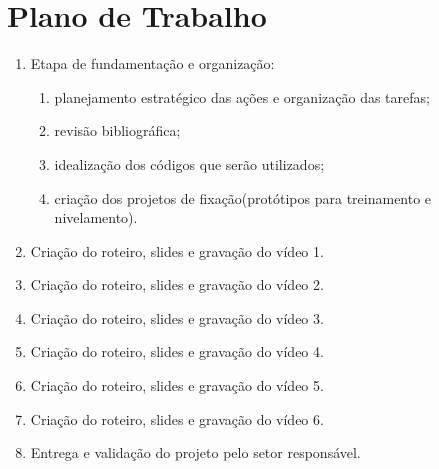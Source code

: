 \documentclass[a4paper,10pt]{article} %
\begin{document}


\section{Plano de Trabalho}

 \begin{enumerate}
  \item Etapa de fundamentação e organização:
      \begin{enumerate}
         \item planejamento estratégico das ações e organização das tarefas;
         \item revisão bibliográfica;
         \item idealização dos códigos que serão utilizados;
         \item criação dos projetos de fixação(protótipos para treinamento e nivelamento).    
      \end{enumerate}    
  \item Criação do roteiro, slides e gravação do vídeo 1.
  \item Criação do roteiro, slides e gravação do vídeo 2.
  \item Criação do roteiro, slides e gravação do vídeo 3.
  \item Criação do roteiro, slides e gravação do vídeo 4.
  \item Criação do roteiro, slides e gravação do vídeo 5.
  \item Criação do roteiro, slides e gravação do vídeo 6.
  \item Entrega e validação do projeto pelo setor responsável.
\end{enumerate}
\end{document}
